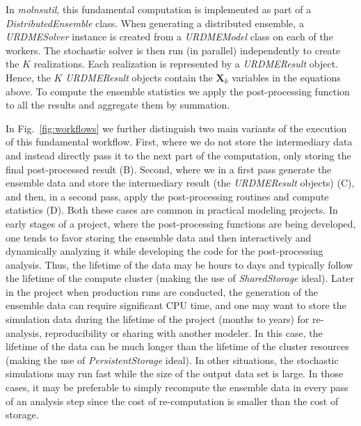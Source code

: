 \documentclass[final,leqno,onefignum,onetabnum]{siamltex1213}
\begin{document}
In \emph{molnsutil}, this fundamental computation is implemented as part of a \emph{DistributedEnsemble} class. When generating a distributed ensemble, a \emph{URDMESolver} instance is created from a \emph{URDMEModel} class on each of the workers. The stochastic solver is then run (in parallel) independently to create the $K$ realizations. Each realization is represented by a \emph{URDMEResult} object. Hence, the $K$ \emph{URDMEResult} objects contain the $\mathbf{X}_k$ variables in the equations above. To compute the ensemble statistics we apply the post-processing function to all the results and aggregate them by summation. 


In Fig.~\ref{fig:workflows} we further distinguish two main variants of the execution of this fundamental workflow. First, where we do not store the intermediary data and instead directly pass it to the next part of the computation, only storing the final post-processed result (B). Second, where we in a first pass generate the ensemble data and store the intermediary result (the \emph{URDMEResult} objects) (C), and then, in a second pass, apply the post-processing routines and compute statistics (D). Both these cases are common in practical modeling projects. In early stages of a project, where the post-processing functions are being developed, one tends to favor storing the ensemble data and then interactively and dynamically analyzing it while developing the code for the post-processing analysis. Thus, the lifetime of the data may be hours to days and typically follow the lifetime of the compute cluster (making the use of \emph{SharedStorage} ideal). Later in the project when production runs are conducted, the generation of the ensemble data can require significant CPU time, and one may want to store the simulation data during the lifetime of the project (months to years) for re-analysis, reproducibility or sharing with another modeler. In this case, the lifetime of the data can be much longer than the lifetime of the cluster resources (making the use of \emph{PersistentStorage} ideal). In other situations, the stochastic simulations may run fast while the size of the output data set is large. In those cases, it may be preferable to simply recompute the ensemble data in every pass of an analysis step since the cost of re-computation is smaller than the cost of storage. 
\end{document}
